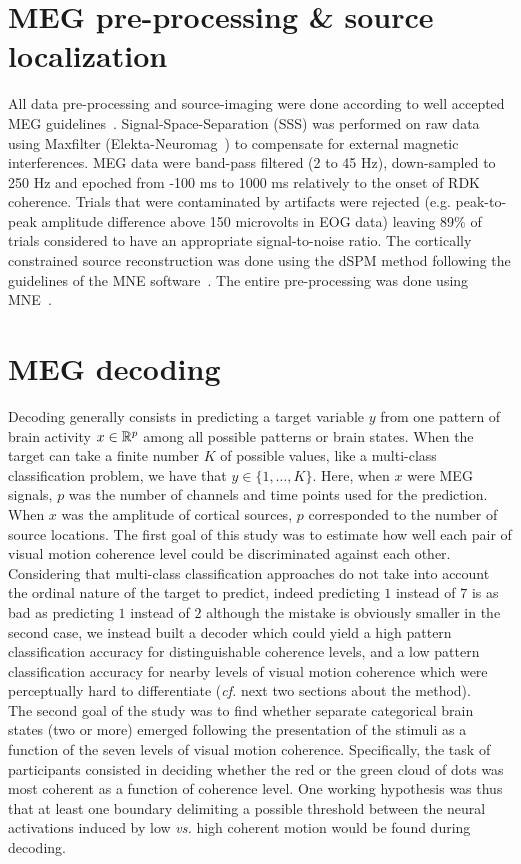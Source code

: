 \section{MEG pre-processing \& source localization}
All data pre-processing and source-imaging were done according to well accepted MEG guidelines~\cite{42gross2013good}. Signal-Space-Separation (SSS) was performed on raw data using Maxfilter (Elekta-Neuromag~\cite{43taulu2006spatiotemporal}) to compensate for external magnetic interferences. MEG data were band-pass filtered (2 to 45 Hz), down-sampled to 250 Hz and epoched from -100 ms to 1000 ms relatively to the onset of RDK coherence. Trials that were contaminated by artifacts were rejected (e.g. peak-to-peak amplitude difference above 150 microvolts in EOG data) leaving 89\% of trials considered to have an appropriate signal-to-noise ratio. The cortically constrained source reconstruction was done using the dSPM method following the guidelines of the MNE software~\cite{mne}. The entire pre-processing was done using MNE~\cite{45gramfort2013meg}.

\section{MEG decoding}
Decoding generally consists in predicting a target variable $y$
from one pattern of brain activity $x\in\mathbb{R}^p$ among all possible patterns or brain states.
When the target can take a finite number $K$ of possible values, like a multi-class classification problem, we have that $y \in\{1,\dots,K\}$. Here, when $x$ were MEG signals, $p$ was the number of channels and time points used for the prediction.
When $x$ was the amplitude of cortical sources, $p$ corresponded to the number of source locations.
The first goal of this study was to estimate how well each pair of visual motion coherence level could be discriminated against each other. Considering that multi-class classification approaches do not take into account the ordinal nature of the target to predict, indeed predicting $1$ instead of $7$ is as bad as predicting $1$ instead of $2$ although the mistake is obviously smaller in the second case, we instead built a decoder which could yield a high pattern classification accuracy for distinguishable coherence levels, and a low pattern classification accuracy for nearby levels of visual motion coherence which were perceptually hard to differentiate (\textit{cf.} next two sections about the method).\\
The second goal of the study was to find whether separate categorical brain states (two or more) emerged following the presentation of the stimuli as a function of the seven levels of visual motion coherence. Specifically, the task of participants consisted in deciding whether the red or the green cloud of dots was most coherent as a function of coherence level. One working hypothesis was thus that at least one boundary delimiting a possible threshold between the neural activations induced by low \textit{vs.} high coherent motion would be found during decoding.

